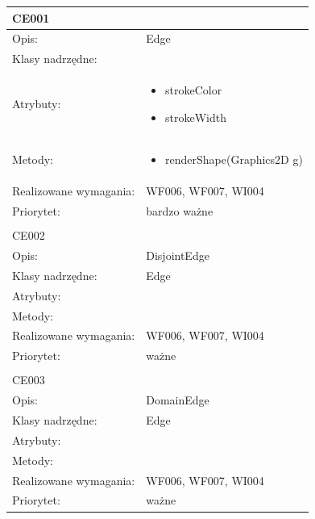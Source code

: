 \documentclass[a4paper,10pt]{article}
\begin{document}
\begin{center}

\begin{longtable}{|m{3cm}|m{9cm}|} \hline

CE001 &  \\ \hline
Opis: & Edge    \\ \hline
Klasy nadrzędne: &     \\ \hline
Atrybuty: & \begin{itemize}
 \item strokeColor
 \item strokeWidth 
\end{itemize}
 \\ \hline
Metody: & \begin{itemize}
 \item renderShape(Graphics2D g)
\end{itemize}
  \\ \hline
Realizowane wymagania: & WF006, WF007, WI004 \\ \hline
Priorytet: & bardzo ważne  \\ \hline

\multicolumn{2}{c}{} \\
 \hline

CE002 &  \\ \hline
Opis: & DisjointEdge    \\ \hline
Klasy nadrzędne: & Edge    \\ \hline
Atrybuty: & %
 \\ \hline
Metody: & %
  \\ \hline
Realizowane wymagania: & WF006, WF007, WI004 \\ \hline
Priorytet: & ważne  \\ \hline

\multicolumn{2}{c}{} \\
 \hline

CE003 &  \\ \hline
Opis: & DomainEdge    \\ \hline
Klasy nadrzędne: & Edge    \\ \hline
Atrybuty: & %
 \\ \hline
Metody: & %
  \\ \hline
Realizowane wymagania: & WF006, WF007, WI004 \\ \hline
Priorytet: & ważne  \\ \hline


\end{longtable}
\end{center}
\end{document}
